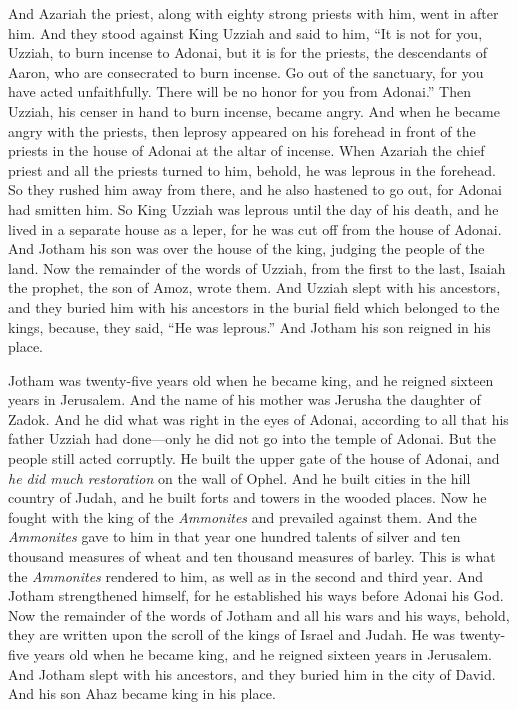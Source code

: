 \begin{biblechapter}
\verse And Azariah the priest, along with eighty strong priests with him, went in after him.
\verse And they stood against King Uzziah and said to him, “It is not for you, Uzziah, to burn incense to Adonai, but it is for the priests, the descendants of Aaron, who are consecrated to burn incense. Go out of the sanctuary, for you have acted unfaithfully. There will be no honor for you from Adonai.”
\verse Then Uzziah, his censer in hand to burn incense, became angry. And when he became angry with the priests, then leprosy appeared on his forehead in front of the priests in the house of Adonai at the altar of incense.
\verse When Azariah the chief priest and all the priests turned to him, behold, he was leprous in the forehead. So they rushed him away from there, and he also hastened to go out, for Adonai had smitten him.
\verse So King Uzziah was leprous until the day of his death, and he lived in a separate house as a leper, for he was cut off from the house of Adonai. And Jotham his son was over the house of the king, judging the people of the land.
\verse Now the remainder of the words of Uzziah, from the first to the last, Isaiah the prophet, the son of Amoz, wrote them.
\verse And Uzziah slept with his ancestors, and they buried him with his ancestors in the burial field which belonged to the kings, because, they said, “He was leprous.” And Jotham his son reigned in his place.
\end{biblechapter}

\begin{biblechapter} %
 Jotham was twenty-five years old when he became king, and he reigned sixteen years in Jerusalem. And the name of his mother was Jerusha the daughter of Zadok.
\verse And he did what was right in the eyes of Adonai, according to all that his father Uzziah had done—only he did not go into the temple of Adonai. But the people still acted corruptly.
\verse He built the upper gate of the house of Adonai, and \textit{he did much restoration} on the wall of Ophel.
\verse And he built cities in the hill country of Judah, and he built forts and towers in the wooded places.
\verse Now he fought with the king of the \textit{Ammonites} and prevailed against them. And the \textit{Ammonites} gave to him in that year one hundred talents of silver and ten thousand measures of wheat and ten thousand measures of barley. This is what the \textit{Ammonites} rendered to him, as well as in the second and third year.
\verse And Jotham strengthened himself, for he established his ways before Adonai his God.
\verse Now the remainder of the words of Jotham and all his wars and his ways, behold, they are written upon the scroll of the kings of Israel and Judah.
\verse He was twenty-five years old when he became king, and he reigned sixteen years in Jerusalem.
\verse And Jotham slept with his ancestors, and they buried him in the city of David. And his son Ahaz became king in his place.
\end{biblechapter}

